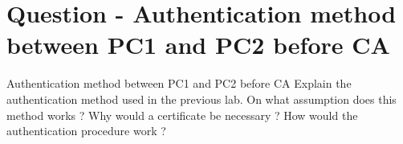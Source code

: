 \section{Question - Authentication method between PC1 and PC2 before CA}

\begin{questionBox}{Authentication method between PC1 and PC2 before CA}
    Explain the authentication method used in the previous lab. On what assumption does this method works ? Why would a certificate be necessary ? How would the authentication procedure work ?
\end{questionBox}
